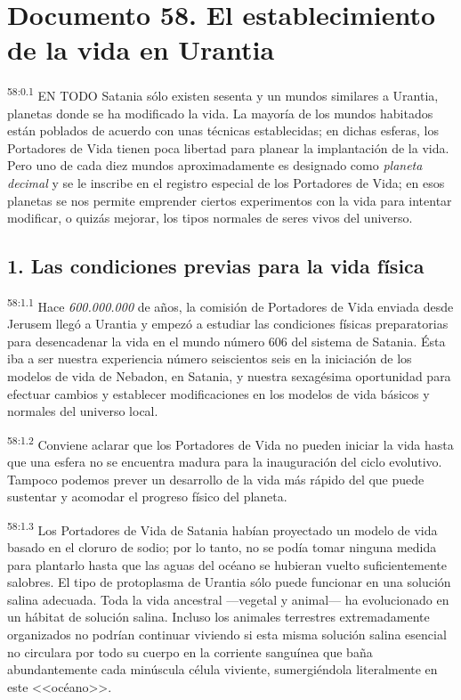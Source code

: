 \chapter{Documento 58. El establecimiento de la vida en Urantia}
\par
\textsuperscript{58:0.1} EN TODO Satania sólo existen sesenta y un mundos similares a Urantia, planetas donde se ha modificado la vida. La mayoría de los mundos habitados están poblados de acuerdo con unas técnicas establecidas; en dichas esferas, los Portadores de Vida tienen poca libertad para planear la implantación de la vida. Pero uno de cada diez mundos aproximadamente es designado como \textit{planeta decimal} y se le inscribe en el registro especial de los Portadores de Vida; en esos planetas se nos permite emprender ciertos experimentos con la vida para intentar modificar, o quizás mejorar, los tipos normales de seres vivos del universo.

\section*{1. Las condiciones previas para la vida física}
\par
\textsuperscript{58:1.1} Hace \textit{600.000.000} de años, la comisión de Portadores de Vida enviada desde Jerusem llegó a Urantia y empezó a estudiar las condiciones físicas preparatorias para desencadenar la vida en el mundo número 606 del sistema de Satania. Ésta iba a ser nuestra experiencia número seiscientos seis en la iniciación de los modelos de vida de Nebadon, en Satania, y nuestra sexagésima oportunidad para efectuar cambios y establecer modificaciones en los modelos de vida básicos y normales del universo local.

\par
\textsuperscript{58:1.2} Conviene aclarar que los Portadores de Vida no pueden iniciar la vida hasta que una esfera no se encuentra madura para la inauguración del ciclo evolutivo. Tampoco podemos prever un desarrollo de la vida más rápido del que puede sustentar y acomodar el progreso físico del planeta.

\par
\textsuperscript{58:1.3} Los Portadores de Vida de Satania habían proyectado un modelo de vida basado en el cloruro de sodio; por lo tanto, no se podía tomar ninguna medida para plantarlo hasta que las aguas del océano se hubieran vuelto suficientemente salobres. El tipo de protoplasma de Urantia sólo puede funcionar en una solución salina adecuada. Toda la vida ancestral ---vegetal y animal--- ha evolucionado en un hábitat de solución salina. Incluso los animales terrestres extremadamente organizados no podrían continuar viviendo si esta misma solución salina esencial no circulara por todo su cuerpo en la corriente sanguínea que baña abundantemente cada minúscula célula viviente, sumergiéndola literalmente en este <<océano>>.

